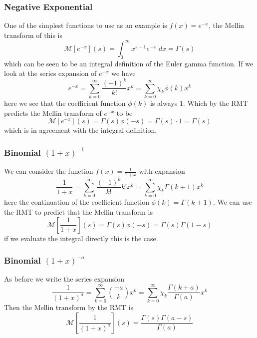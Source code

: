 \documentclass{article}
\begin{document}
\subsubsection{Negative Exponential}
One of the simplest functions to use as an example is $f(x)=e^{-x}$, the Mellin transform of this is
\begin{equation}
\mathcal{M}[e^{-x}](s) = \int_0^\infty x^{s-1}e^{-x} \; dx = \Gamma(s)
\end{equation}
which can be seen to be an integral definition of the Euler gamma function. If we look at the series expansion of $e^{-x}$ we have
\begin{equation}
e^{-x} = \sum_{k=0}^\infty \frac{(-1)^k}{k!} x^k = \sum_{k=0}^\infty \chi_k \phi(k) x^k
\end{equation}
here we see that the coefficient function $\phi(k)$ is always $1$. Which by the RMT predicts the Mellin transform of $e^{-x}$ to be
\begin{equation}
\mathcal{M}[e^{-x}](s) = \Gamma(s)\phi(-s) = \Gamma(s)\cdot 1 = \Gamma(s)
\end{equation}
which is in agreement with the integral definition.
\subsubsection{Binomial $(1+x)^{-1}$}
We can consider the function $f(x) = \frac{1}{1+x}$ with expansion
\begin{equation}
\frac{1}{1+x} = \sum_{k=0}^\infty \frac{(-1)^k}{k!} k! x^k = \sum_{k=0}^\infty \chi_k \Gamma(k+1) x^k
\end{equation}
here the continuation of the coefficient function $\phi(k) = \Gamma(k+1)$. We can use the RMT to predict that the Mellin transform is
\begin{equation}
\mathcal{M}\left[\frac{1}{1+x}\right](s) = \Gamma(s)\phi(-s) = \Gamma(s)\Gamma(1-s)
\end{equation}
if we evaluate the integral directly this is the case.
\subsubsection{Binomial $(1+x)^{-a}$}
As before we write the series expansion
\begin{equation}
\frac{1}{(1+x)^a} = \sum_{k=0}^\infty \binom{-a}{k} x^k = \sum_{k=0}^\infty \chi_k \frac{\Gamma(k+a)}{\Gamma(a)} x^k
\end{equation}
Then the Mellin transform by the RMT is 
\begin{equation}
\mathcal{M}\left[\frac{1}{(1+x)^a}\right](s) = \frac{\Gamma(s)\Gamma(a-s)}{\Gamma(a)}
\end{equation}
\end{document}
